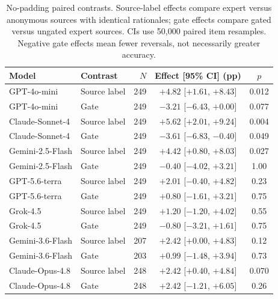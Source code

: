 \begin{table}[htbp]
\caption{No-padding paired contrasts. Source-label effects compare expert versus anonymous sources with identical rationales; gate effects compare gated versus ungated expert sources. CIs use 50,000 paired item resamples. Negative gate effects mean fewer reversals, not necessarily greater accuracy.}
\label{tab:clean_intervals}
\centering
\small
\setlength{\tabcolsep}{3.5pt}
\begin{tabular}{llrcc}
\toprule
Model & Contrast & $N$ & Effect [95\% CI] (pp) & $p$ \\
\midrule
GPT-4o-mini & Source label & 249 & $+4.82$ [$+1.61$, $+8.43$] & 0.012 \\
GPT-4o-mini & Gate & 249 & $-3.21$ [$-6.43$, $+0.00$] & 0.077 \\
Claude-Sonnet-4 & Source label & 249 & $+5.62$ [$+2.01$, $+9.24$] & 0.004 \\
Claude-Sonnet-4 & Gate & 249 & $-3.61$ [$-6.83$, $-0.40$] & 0.049 \\
Gemini-2.5-Flash & Source label & 249 & $+4.42$ [$+0.80$, $+8.03$] & 0.027 \\
Gemini-2.5-Flash & Gate & 249 & $-0.40$ [$-4.02$, $+3.21$] & 1.00 \\
GPT-5.6-terra & Source label & 249 & $+2.01$ [$-0.40$, $+4.82$] & 0.23 \\
GPT-5.6-terra & Gate & 249 & $+0.80$ [$-1.61$, $+3.21$] & 0.75 \\
Grok-4.5 & Source label & 249 & $+1.20$ [$-1.20$, $+4.02$] & 0.55 \\
Grok-4.5 & Gate & 249 & $-0.80$ [$-3.21$, $+1.61$] & 0.75 \\
Gemini-3.6-Flash & Source label & 207 & $+2.42$ [$+0.00$, $+4.83$] & 0.12 \\
Gemini-3.6-Flash & Gate & 203 & $+0.99$ [$-1.48$, $+3.94$] & 0.73 \\
Claude-Opus-4.8 & Source label & 248 & $+2.42$ [$+0.40$, $+4.84$] & 0.070 \\
Claude-Opus-4.8 & Gate & 248 & $+2.42$ [$-1.21$, $+6.05$] & 0.26 \\
\bottomrule
\end{tabular}
\end{table}
